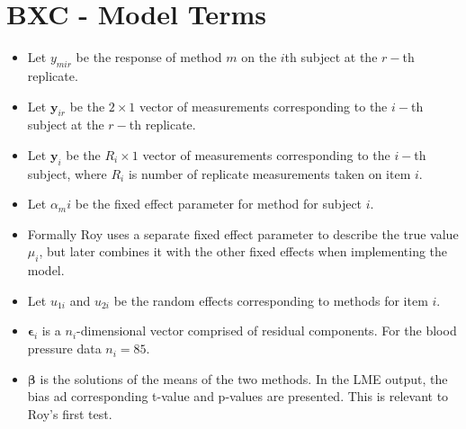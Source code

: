\documentclass[12pt, a4paper]{report}
\theoremstyle{plain}
\theoremstyle{definition}
\theoremstyle{remark}
\begin{document}
		
		


\section{BXC - Model Terms}

\begin{itemize}
	\item Let $y_{mir}$ be the response of method $m$ on the $i$th subject
	at the $r-$th replicate.
	\item Let $\boldsymbol{y}_{ir}$ be the $2 \times 1$ vector of measurements
	corresponding to the $i-$th subject at the $r-$th replicate.
	\item Let $\boldsymbol{y}_{i}$ be the $R_i \times 1$ vector of
	measurements corresponding to the $i-$th subject, where $R_i$ is number of replicate measurements taken on item $i$.
	\item Let $\alpha_mi$ be the fixed effect parameter for method for subject $i$.
	\item Formally Roy uses a separate fixed effect parameter to describe the true value $\mu_i$, but later combines it with the other fixed effects when implementing the model.
	\item Let $u_{1i}$ and $u_{2i}$ be the random effects corresponding to methods for item $i$.
	
	\item $\boldsymbol{\epsilon}_{i}$ is a $n_{i}$-dimensional vector
	comprised of residual components. For the blood pressure data $n_{i} = 85$.
	
	\item $\boldsymbol{\beta}$ is the solutions of the means of the two methods. In the LME output, the bias ad corresponding
	t-value and p-values are presented. This is relevant to Roy's first test.\end{itemize}
\end{document}
